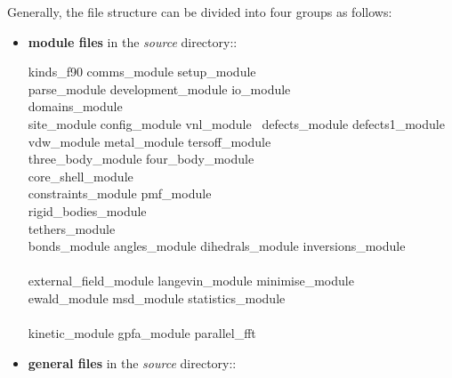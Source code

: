 Generally, the \D file structure can be divided into four groups
as follows:
\begin{itemize}

\item {\bf module files} in the {\em source} directory::

{\sc
kinds\_f90 comms\_module setup\_module \\
parse\_module development\_module io\_module \\
domains\_module \\
site\_module config\_module vnl\_module \
defects\_module defects1\_module \\
vdw\_module metal\_module tersoff\_module \\
three\_body\_module four\_body\_module \\
core\_shell\_module \\
constraints\_module pmf\_module \\
rigid\_bodies\_module \\
tethers\_module \\
bonds\_module angles\_module dihedrals\_module inversions\_module \\
\\
external\_field\_module langevin\_module minimise\_module \\
ewald\_module msd\_module statistics\_module \\
\\
kinetic\_module gpfa\_module parallel\_fft}

\item {\bf general files} in the {\em source} directory::


\end{itemize}
